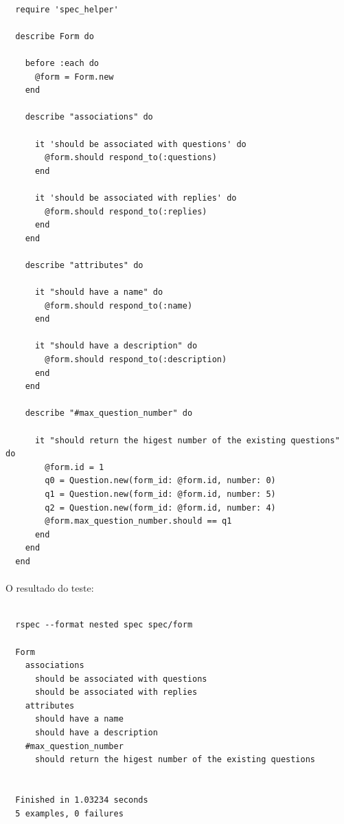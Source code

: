 \documentclass[11pt]{article}
\begin{document}
    {\scriptsize
      \lstset{language=Ruby}
      \begin{lstlisting}
      
  require 'spec_helper'

  describe Form do

    before :each do
      @form = Form.new
    end

    describe "associations" do
    
      it 'should be associated with questions' do
        @form.should respond_to(:questions)
      end
    
      it 'should be associated with replies' do
        @form.should respond_to(:replies)
      end
    end

    describe "attributes" do

      it "should have a name" do
        @form.should respond_to(:name)
      end

      it "should have a description" do
        @form.should respond_to(:description)
      end
    end
    
    describe "#max_question_number" do
    
      it "should return the higest number of the existing questions" do
        @form.id = 1
        q0 = Question.new(form_id: @form.id, number: 0)
        q1 = Question.new(form_id: @form.id, number: 5)
        q2 = Question.new(form_id: @form.id, number: 4)
        @form.max_question_number.should == q1
      end
    end
  end
      \end{lstlisting}
    }
    
  \clearpage
    
    \paragraph{}
    
    O resultado do teste:
    
    {\scriptsize
      \lstset{language=Bash}
      \begin{lstlisting}

  rspec --format nested spec spec/form
      
  Form
    associations
      should be associated with questions
      should be associated with replies
    attributes
      should have a name
      should have a description
    #max_question_number
      should return the higest number of the existing questions


  Finished in 1.03234 seconds
  5 examples, 0 failures
      \end{lstlisting}
    }
    
\end{document}
